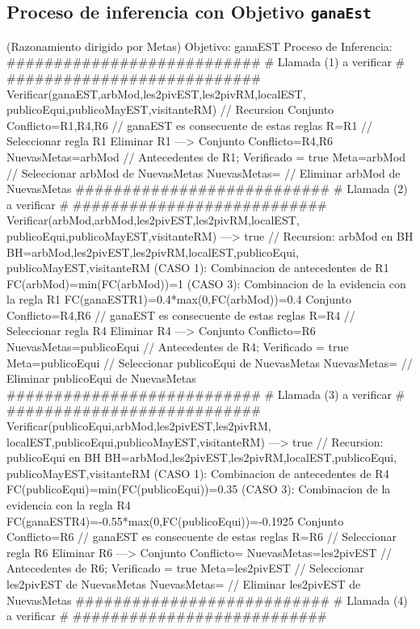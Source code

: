 \subsection{Proceso de inferencia con Objetivo \texttt{ganaEst}}
\begin{listing}[language=Pascal]
(Razonamiento dirigido por Metas)
Objetivo: ganaEST
Proceso de Inferencia: 
  ###########################
  # Llamada (1) a verificar #
  ###########################
	Verificar(ganaEST,{arbMod,les2pivEST,les2pivRM,localEST, publicoEqui,publicoMayEST,visitanteRM}) // Recursion 
	Conjunto Conflicto={R1,R4,R6} // ganaEST es consecuente de estas reglas
	R={R1} // Seleccionar regla R1
	Eliminar R1 ---> Conjunto Conflicto={R4,R6}
	NuevasMetas={arbMod} // Antecedentes de R1; Verificado = true
	Meta=arbMod // Seleccionar arbMod de NuevasMetas
	NuevasMetas={} // Eliminar arbMod de NuevasMetas
  ###########################
  # Llamada (2) a verificar #
  ###########################
	Verificar(arbMod,{arbMod,les2pivEST,les2pivRM,localEST, publicoEqui,publicoMayEST,visitanteRM}) ---> true // Recursion: arbMod en BH
	BH={arbMod,les2pivEST,les2pivRM,localEST,publicoEqui, publicoMayEST,visitanteRM}
	(CASO 1): Combinacion de antecedentes de R1
	 FC(arbMod)=min(FC(arbMod))=1
	(CASO 3): Combinacion de la evidencia con la regla R1
	 FC(ganaEST{R1})=0.4*max(0,FC(arbMod))=0.4
	Conjunto Conflicto={R4,R6} // ganaEST es consecuente de estas reglas
	R={R4} // Seleccionar regla R4
	Eliminar R4 ---> Conjunto Conflicto={R6}
	NuevasMetas={publicoEqui} // Antecedentes de R4; Verificado = true
	Meta=publicoEqui // Seleccionar publicoEqui de NuevasMetas
	NuevasMetas={} // Eliminar publicoEqui de NuevasMetas
  ###########################
  # Llamada (3) a verificar #
  ###########################
	Verificar(publicoEqui,{arbMod,les2pivEST,les2pivRM, localEST,publicoEqui,publicoMayEST,visitanteRM}) ---> true // Recursion: publicoEqui en BH
	BH={arbMod,les2pivEST,les2pivRM,localEST,publicoEqui, publicoMayEST,visitanteRM}
	(CASO 1): Combinacion de antecedentes de R4
	 FC(publicoEqui)=min(FC(publicoEqui))=0.35
	(CASO 3): Combinacion de la evidencia con la regla R4
	 FC(ganaEST{R4})=-0.55*max(0,FC(publicoEqui))=-0.1925
	Conjunto Conflicto={R6} // ganaEST es consecuente de estas reglas
	R={R6} // Seleccionar regla R6
	Eliminar R6 ---> Conjunto Conflicto={}
	NuevasMetas={les2pivEST} // Antecedentes de R6; Verificado = true
	Meta=les2pivEST // Seleccionar les2pivEST de NuevasMetas
	NuevasMetas={} // Eliminar les2pivEST de NuevasMetas
  ###########################
  # Llamada (4) a verificar #
  ###########################

\end{listing}
